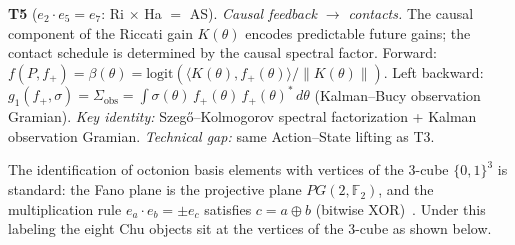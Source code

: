 \begin{remark}
\medskip\noindent
\textbf{T5}\; ($e_2 \cdot e_5 = e_7$: Ri $\times$ Ha $=$ AS).
\emph{Causal feedback $\to$ contacts.}\;
The causal component of the Riccati gain $K(\theta)$
encodes predictable future gains; the contact schedule is
determined by the causal spectral factor.
Forward: $f(P, f_+) = \beta(\theta)
= \mathrm{logit}(\langle K(\theta), f_+(\theta)\rangle
  / \|K(\theta)\|)$.
Left backward: $g_1(f_+, \sigma)
= \Sigma_{\mathrm{obs}}
= \int \sigma(\theta)\,f_+(\theta)\,f_+(\theta)^*\,d\theta$
(Kalman--Bucy observation Gramian).
\emph{Key identity:} Szeg\H{o}--Kolmogorov spectral
factorization + Kalman observation Gramian.
\emph{Technical gap:} same Action--State lifting as T3.
\end{remark}

\begin{remark}
\label{rmk:hypercube}
The identification of octonion basis elements with vertices of
the $3$-cube $\{0,1\}^3$ is standard: the Fano plane is the
projective plane $PG(2,\mathbb{F}_2)$, and the multiplication
rule $e_a \cdot e_b = \pm e_c$ satisfies
$c = a \oplus b$ (bitwise XOR)~\cite{BaezOctonions}.
Under this labeling the eight Chu objects sit at the vertices
of the $3$-cube as shown below.

\begin{center}
\end{center}
\end{remark}
